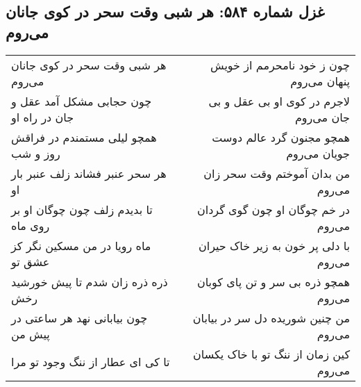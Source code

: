 \begin{center}
\section*{غزل شماره ۵۸۴: هر شبی وقت سحر در کوی جانان می‌روم}
\label{sec:584}
\begin{longtable}{l p{0.5cm} r}
هر شبی وقت سحر در کوی جانان می‌روم
&&
چون ز خود نامحرمم از خویش پنهان می‌روم
\\
چون حجابی مشکل آمد عقل و جان در راه او
&&
لاجرم در کوی او بی عقل و بی جان می‌روم
\\
همچو لیلی مستمندم در فراقش روز و شب
&&
همچو مجنون گرد عالم دوست جویان می‌روم
\\
هر سحر عنبر فشاند زلف عنبر بار او
&&
من بدان آموختم وقت سحر زان می‌روم
\\
تا بدیدم زلف چون چوگان او بر روی ماه
&&
در خم چوگان او چون گوی گردان می‌روم
\\
ماه رویا در من مسکین نگر کز عشق تو
&&
با دلی پر خون به زیر خاک حیران می‌روم
\\
ذره ذره زان شدم تا پیش خورشید رخش
&&
همچو ذره بی سر و تن پای کوبان می‌روم
\\
چون بیابانی نهد هر ساعتی در پیش من
&&
من چنین شوریده دل سر در بیابان می‌روم
\\
تا کی ای عطار از ننگ وجود تو مرا
&&
کین زمان از ننگ تو با خاک یکسان می‌روم
\\
\end{longtable}
\end{center}
